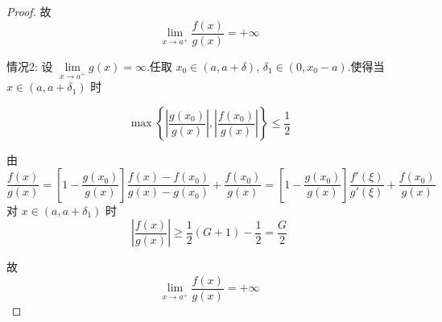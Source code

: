 \begin{proof}
	故
	\[
	\lim_{x \to a^+} \frac{f(x)}{g(x)} = +\infty
	\]
	
	情况2: 设 $\lim\limits_{x \to a^+} g(x) = \infty$.任取 $x_0 \in (a, a+\delta)$, $\delta_1 \in (0, x_0 - a)$.使得当 $x \in (a, a+\delta_1)$ 时
	
	\[
	\max \left\{ \left|\dfrac{g(x_0)}{g(x)}\right|, \left|\dfrac{f(x_0)}{g(x)}\right|\right\} \leqslant \frac{1}{2}
	\]
	
	由
	\[
	\frac{f(x)}{g(x)} = \left[1 - \frac{g(x_0)}{g(x)}\right] \frac{f(x) - f(x_0)}{g(x) - g(x_0)} + \frac{f(x_0)}{g(x)}	= \left[1 - \frac{g(x_0)}{g(x)}\right] \frac{f'(\xi)}{g'(\xi)} + \frac{f(x_0)}{g(x)}
	\]
	对 $x \in (a, a+\delta_1)$ 时
	\[
	\left|\frac{f(x)}{g(x)}\right| \geqslant \frac{1}{2}(G + 1) - \frac{1}{2} = \frac{G}{2}
	\]
	
	故
	\[
	\lim_{x \to a^+} \frac{f(x)}{g(x)} = +\infty
	\]
	
\end{proof}


